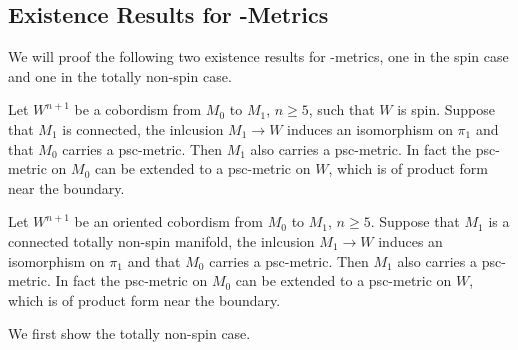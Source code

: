 \subsection{Existence Results for \psc-Metrics}

We will proof the following two existence results for \psc-metrics, one in the spin case and one in the totally non-spin case.

\begin{theorem}
    \label{psc:thm:existence_result_spin}
    Let $W^{n+1}$ be a cobordism from $M_0$ to $M_1$, $n \geq 5$, such that $W$ is spin. Suppose that $M_1$ is connected, the inlcusion $M_1 \to W$ induces an isomorphism on $\pi_1$ and that $M_0$ carries a psc-metric. Then $M_1$ also carries a psc-metric. In fact the psc-metric on $M_0$ can be extended to a psc-metric on $W$, which is of product form near the boundary. 
\end{theorem}

\begin{theorem}
    \label{psc:thm:existence_result_totally_non_spin}
    Let $W^{n+1}$ be an oriented cobordism from $M_0$ to $M_1$, $n \geq 5$. Suppose that $M_1$ is a connected totally non-spin manifold, the inlcusion $M_1 \to W$ induces an isomorphism on $\pi_1$ and that $M_0$ carries a psc-metric. Then $M_1$ also carries a psc-metric. In fact the psc-metric on $M_0$ can be extended to a psc-metric on $W$, which is of product form near the boundary. 
\end{theorem}

We first show the totally non-spin case.

